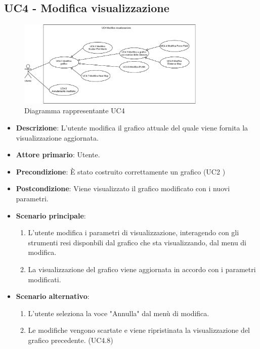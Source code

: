 \newpage
\subsection{UC4 - Modifica visualizzazione}
\label{sub:uc4}

\begin{figure}[h]
    \centering
    \includegraphics[width=0.8\textwidth]{componenti/casi-duso/diagrammi/UC4.pdf}
    \caption{Diagramma rappresentante UC4}
    \label{fig:UC4}
\end{figure}


\begin{itemize}
    \item \textbf{Descrizione}: L’utente modifica il grafico attuale del quale viene fornita la visualizzazione aggiornata.
	
    \item \textbf{Attore primario}: Utente.
    
    \item \textbf{Precondizione}:   È stato costruito correttamente un grafico (UC2 )

    \item \textbf{Postcondizione}:  Viene visualizzato il grafico modificato con i nuovi parametri.

	\item \textbf{Scenario principale}:
		\begin{enumerate}
            \item L'utente modifica i parametri di visualizzazione, interagendo con gli strumenti resi disponbili dal grafico che sta visualizzando,
                    dal menu di modifica.
            \item La visualizzazione del grafico viene aggiornata in accordo con i parametri modificati.
        \end{enumerate}

    \item \textbf{Scenario alternativo}:
        \begin{enumerate}
            \item L'utente seleziona la voce "Annulla" dal menù di modifica.
            \item Le modifiche vengono scartate e viene ripristinata la visualizzazione del grafico precedente.  (UC4.8)
        \end{enumerate}
    
\end{itemize}

